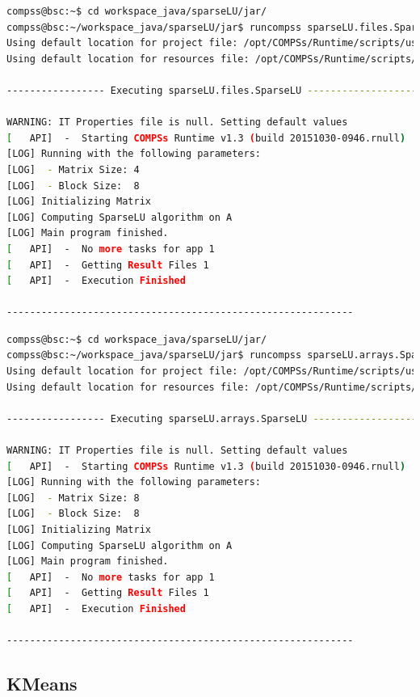 \begin{lstlisting}[language=bash]
compss@bsc:~$ cd workspace_java/sparseLU/jar/
compss@bsc:~/workspace_java/sparseLU/jar$ runcompss sparseLU.files.SparseLU 4 8
Using default location for project file: /opt/COMPSs/Runtime/scripts/user/../../configuration/xml/projects/project.xml
Using default location for resources file: /opt/COMPSs/Runtime/scripts/user/../../configuration/xml/resources/resources.xml

----------------- Executing sparseLU.files.SparseLU --------------------------

WARNING: IT Properties file is null. Setting default values
[   API]  -  Starting COMPSs Runtime v1.3 (build 20151030-0946.rnull)
[LOG] Running with the following parameters:
[LOG]  - Matrix Size: 4
[LOG]  - Block Size:  8
[LOG] Initializing Matrix
[LOG] Computing SparseLU algorithm on A
[LOG] Main program finished.
[   API]  -  No more tasks for app 1
[   API]  -  Getting Result Files 1
[   API]  -  Execution Finished

------------------------------------------------------------
\end{lstlisting}

\begin{lstlisting}[language=bash]
compss@bsc:~$ cd workspace_java/sparseLU/jar/
compss@bsc:~/workspace_java/sparseLU/jar$ runcompss sparseLU.arrays.SparseLU 8 8
Using default location for project file: /opt/COMPSs/Runtime/scripts/user/../../configuration/xml/projects/project.xml
Using default location for resources file: /opt/COMPSs/Runtime/scripts/user/../../configuration/xml/resources/resources.xml

----------------- Executing sparseLU.arrays.SparseLU --------------------------

WARNING: IT Properties file is null. Setting default values
[   API]  -  Starting COMPSs Runtime v1.3 (build 20151030-0946.rnull)
[LOG] Running with the following parameters:
[LOG]  - Matrix Size: 8
[LOG]  - Block Size:  8
[LOG] Initializing Matrix
[LOG] Computing SparseLU algorithm on A
[LOG] Main program finished.
[   API]  -  No more tasks for app 1
[   API]  -  Getting Result Files 1
[   API]  -  Execution Finished

------------------------------------------------------------
\end{lstlisting}


\subsection{KMeans}


